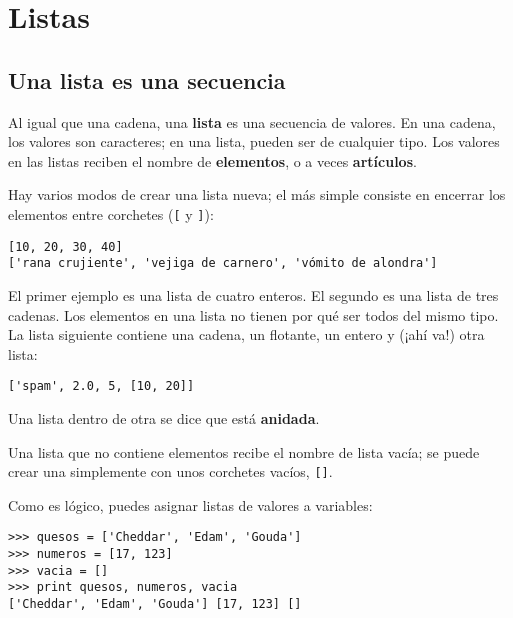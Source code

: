 
\chapter{Listas}



\section{Una lista es una secuencia}

Al igual que una cadena, una {\bf lista} es una secuencia de valores. En una cadena, los
valores son caracteres; en una lista, pueden ser de cualquier tipo. Los valores en las
listas reciben el nombre de {\bf elementos}, o a veces {\bf artículos}.


Hay varios modos de crear una lista nueva; el más simple
consiste en encerrar los elementos entre corchetes (\verb"[" y \verb"]"):

\beforeverb
\begin{verbatim}
[10, 20, 30, 40]
['rana crujiente', 'vejiga de carnero', 'vómito de alondra']
\end{verbatim}
\afterverb
%
El primer ejemplo es una lista de cuatro enteros. El segundo es una lista
de tres cadenas. Los elementos en una lista no tienen por qué ser todos del mismo tipo.
La lista siguiente contiene una cadena, un flotante, un entero y
(¡ahí va!) otra lista:

\beforeverb
\begin{verbatim}
['spam', 2.0, 5, [10, 20]]
\end{verbatim}
\afterverb
%
Una lista dentro de otra se dice que está {\bf anidada}.


Una lista que no contiene elementos recibe el nombre
de lista vacía; se puede crear una simplemente
con unos corchetes vacíos, \verb"[]".


Como es lógico, puedes asignar listas de valores a variables:

\beforeverb
\begin{verbatim}
>>> quesos = ['Cheddar', 'Edam', 'Gouda']
>>> numeros = [17, 123]
>>> vacia = []
>>> print quesos, numeros, vacia
['Cheddar', 'Edam', 'Gouda'] [17, 123] []
\end{verbatim}
\afterverb
%

